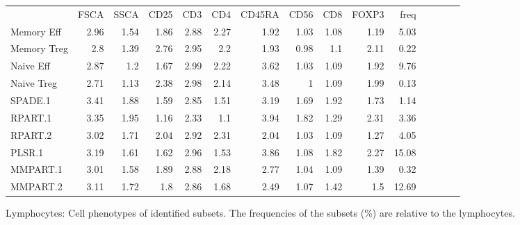 \begin{table}[h]\footnotesize
\centering
\begin{tabular}{lrrrrrrrrrrrrrr}
\rowcolor{Gray}
            & FSCA & SSCA & CD25 & CD3  & CD4  & CD45RA & CD56 & CD8  & FOXP3 & freq \\
Memory Eff  & 2.96 & 1.54 & 1.86 & 2.88 & 2.27 & 1.92 & 1.03 & 1.08 & 1.19 & 5.03 \\
Memory Treg & 2.8  & 1.39 & 2.76 & 2.95 & 2.2  & 1.93 & 0.98 & 1.1  & 2.11 & 0.22 \\
Naive Eff   & 2.87 & 1.2  & 1.67 & 2.99 & 2.22 & 3.62 & 1.03 & 1.09 & 1.92 & 9.76 \\
Naive Treg  & 2.71 & 1.13 & 2.38 & 2.98 & 2.14 & 3.48 & 1    & 1.09 & 1.99 & 0.13 \\
\hline
SPADE.1     & 3.41 & 1.88 & 1.59 & 2.85 & 1.51 & 3.19 & 1.69 & 1.92 & 1.73 & 1.14 \\
RPART.1     & 3.35 & 1.95 & 1.16 & 2.33 & 1.1  & 3.94 & 1.82 & 1.29 & 2.31 & 3.36 \\
RPART.2     & 3.02 & 1.71 & 2.04 & 2.92 & 2.31 & 2.04 & 1.03 & 1.09 & 1.27 & 4.05 \\
PLSR.1      & 3.19 & 1.61 & 1.62 & 2.96 & 1.53 & 3.86 & 1.08 & 1.82 & 2.27 & 15.08 \\
MMPART.1    & 3.01 & 1.58 & 1.89 & 2.88 & 2.18 & 2.77 & 1.04 & 1.09 & 1.39 & 0.32 \\
MMPART.2    & 3.11 & 1.72 & 1.8  & 2.86 & 1.68 & 2.49 & 1.07 & 1.42 & 1.5  & 12.69 \\
\end{tabular}
{ Lymphocytes: Cell phenotypes of identified subsets. }
{ The frequencies of the subsets (\%) are relative to the lymphocytes. }
\end{table}


